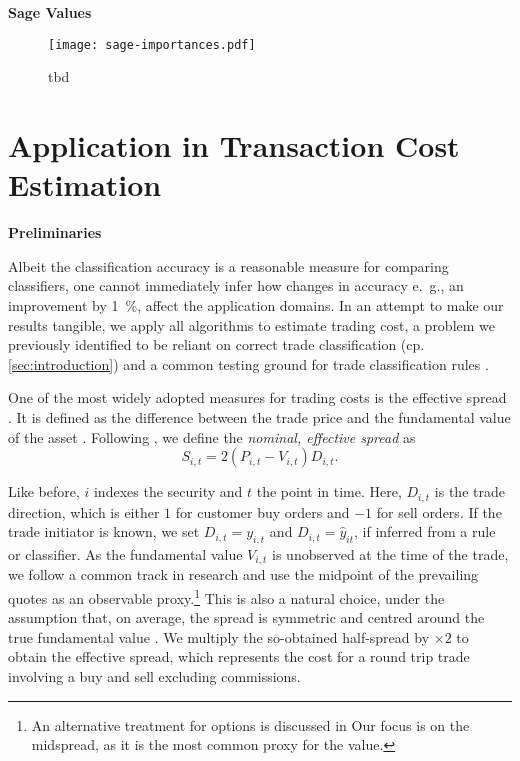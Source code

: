 \textbf{Sage Values}

\begin{figure}[h!]
    \centering
    \texttt{[image: sage-importances.pdf]}
    \caption[tbd]{tbd}
    \label{fig:sage-importances}
\end{figure}


\clearpage

\section{Application in Transaction Cost Estimation}\label{sec:application}

\textbf{Preliminaries}

Albeit the classification accuracy is a reasonable measure for comparing classifiers, one cannot immediately infer how changes in accuracy e.~g., an improvement by \SI{1}{\percent}, affect the application domains. In an attempt to make our results tangible, we apply all algorithms to estimate trading cost, a problem we previously identified to be reliant on correct trade classification (cp. \cref{sec:introduction}) and a common testing ground for trade classification rules \autocites[cp.][541]{ellisAccuracyTradeClassification2000}[][569]{finucaneDirectTestMethods2000}[][271--278]{petersonEvaluationBiasesExecution2003}[][896--897]{savickasInferringDirectionOption2003}.

One of the most widely adopted measures for trading costs is the effective spread \autocite[][112]{Piwowar_2006}. It is defined as the difference between the trade price and the fundamental value of the asset \autocite[][238--239]{bessembinderIssuesAssessingTrade2003}. Following \textcite[][238--239]{bessembinderIssuesAssessingTrade2003}, we define the \emph{nominal, effective spread} as
\begin{equation}
    S_{i,t} = 2 (P_{i,t} - V_{i,t}) D_{i,t}.
    \label{eq:effective-spread}
\end{equation}

Like before, $i$ indexes the security and $t$ the point in time. Here, $D_{i,t}$ is the trade direction, which is either $1$ for customer buy orders and $-1$ for sell orders. If the trade initiator is known, we set $D_{i,t} = y_{i,t}$ and $D_{i,t}=\hat{y}_{it}$, if inferred from a rule or classifier. As the fundamental value $V_{i,t}$ is unobserved at the time of the trade, we follow a common track in research and use the midpoint of the prevailing quotes as an observable proxy.\footnote{An alternative treatment for options is discussed in \textcite[][4975--4976]{muravyevOptionsTradingCosts2020} Our focus is on the midspread, as it is the most common proxy for the value.} This is also a natural choice, under the assumption that, on average, the spread is symmetric and centred around the true fundamental value \autocite[][1018]{leeMarketIntegrationPrice1993}. We multiply the so-obtained half-spread by $\times 2$ to obtain the effective spread, which represents the cost for a round trip trade involving a buy and sell excluding commissions.

